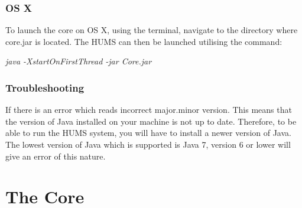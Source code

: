 \documentclass[10pt,a4paper]{article}
\begin{document}
\subsubsection{OS X}
To launch the core on OS X, using the terminal, navigate to the directory where core.jar is located. The HUMS can then be launched utilising the command:
\begin{center}
\textit{java -XstartOnFirstThread -jar Core.jar}
\end{center}

\subsubsection{Troubleshooting}
If there is an error which reads incorrect major.minor version. This means that the version of Java installed on your machine is not up to date. Therefore, to be able to run the HUMS system, you will have to install a newer version of Java. The lowest version of Java which is supported is Java 7, version 6 or lower will give an error of this nature.

\section{The Core}
\end{document}
